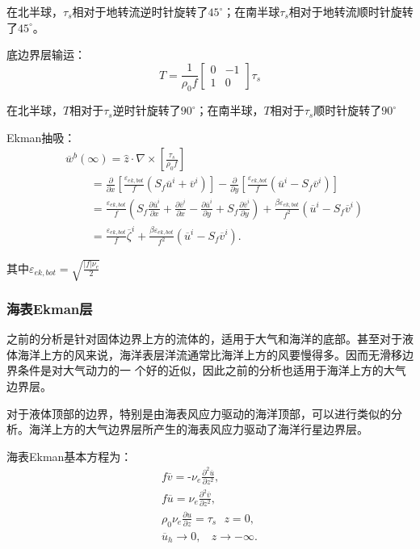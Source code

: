 \documentclass{article}
\begin{document}
在北半球，$\tau_s$相对于地转流逆时针旋转了$45^{\circ}$；在南半球$\tau_s$相对于地转流顺时针旋转了$45^{\circ}$。

底边界层输运：
$$T=\frac{1}{\rho_0f}\begin{bmatrix}
    0&-1\\
    1& 0
\end{bmatrix}\tau_s$$

在北半球，$T$相对于$\tau_s$逆时针旋转了$90^{\circ}$；在南半球，$T$相对于$\tau_s$顺时针旋转了$90^{\circ}$

Ekman抽吸：
\begin{align}
  & {{\overline{w}}^{b}}(\infty )=\widehat{z}\cdot \nabla \times \left[ \frac{{{\tau }_{s}}}{{{\rho }_{0}}f} \right] \\ 
 & \ \ \ \ \ \ \ \ \ \ =\frac{\partial }{\partial x}\left[\frac{{{\varepsilon }_{ek,bot}}}{f}({{S}_{f}}{{\overline{u}}^{i}}+{{\overline{v}}^{i}})\right]-\frac{\partial }{\partial y}\left[\frac{{{\varepsilon }_{ek,bot}}}{f}({{\overline{u}}^{i}}-{{S}_{f}}{{\overline{v}}^{i}})\right] \\ 
 & \ \ \ \ \ \ \ \ \ \ =\frac{{{\varepsilon }_{ek,bot}}}{f}({{S}_{f}}\frac{\partial {{\overline{u}}^{i}}}{\partial x}+\frac{\partial {{\overline{v}}^{i}}}{\partial x}-\frac{\partial {{\overline{u}}^{i}}}{\partial y}+{{S}_{f}}\frac{\partial {{\overline{v}}^{i}}}{\partial y})+\frac{\beta {{\varepsilon }_{ek,bot}}}{{{f}^{2}}}({{\overline{u}}^{i}}-{{S}_{f}}{{\overline{v}}^{i}}) \\ 
 & \ \ \ \ \ \ \ \ \ \ =\frac{{{\varepsilon }_{ek,bot}}}{f}{{\overline{\zeta }}^{i}}+\frac{\beta {{\varepsilon }_{ek,bot}}}{{{f}^{2}}}({{\overline{u}}^{i}}-{{S}_{f}}{{\overline{v}}^{i}}).\ \ \ \  
\end{align}

其中${\varepsilon }_{ek,bot}=\sqrt{\frac{|f|\nu_e}{2}}$

\subsubsection{海表Ekman层}
之前的分析是针对固体边界上方的流体的，适用于大气和海洋的底部。甚至对于液体海洋上方的风来说，海洋表层洋流通常比海洋上方的风要慢得多。因而无滑移边界条件是对大气动力的一 个好的近似，因此之前的分析也适用于海洋上方的大气边界层。

对于液体顶部的边界，特别是由海表风应力驱动的海洋顶部，可以进行类似的分析。海洋上方的大气边界层所产生的海表风应力驱动了海洋行星边界层。

海表Ekman基本方程为：
\begin{align}
  & f\overline{v}=\text{-}{{\nu }_{e}}\frac{{{\partial }^{2}}\overline{u}}{\partial {{z}^{2}}}, \\ 
 & f\overline{u}={{\nu }_{e}}\frac{{{\partial }^{2}}\overline{v}}{\partial {{z}^{2}}}, \\ 
 & \rho_0\nu_e\frac{\partial u}{\partial z} = \tau_s\ \ \ z=0, \\ 
 & {{\overline{u}}_{h}}\to 0,\ \ \ \ z\to -\infty .\ \ \ \  
\end{align}
\end{document}

